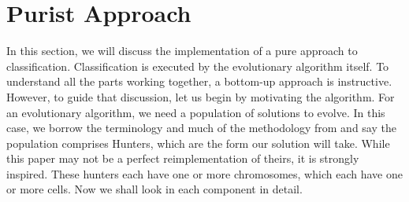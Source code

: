 \section{Purist Approach}
In this section, we will discuss the implementation of a pure approach to classification.  Classification is executed by the evolutionary algorithm itself.  To understand all the parts working together, a bottom-up approach is instructive.  However, to guide that discussion, let us begin by motivating the algorithm.
For an evolutionary algorithm, we need a population of solutions to evolve.  In this case, we borrow the terminology and much of the methodology from \cite{kharma_project_2004} and say the population comprises Hunters, which are the form our solution will take.  While this paper may not be a perfect reimplementation of theirs, it is strongly inspired.  These hunters each have one or more chromosomes, which each have one or more cells.  Now we shall look in each component in detail.
